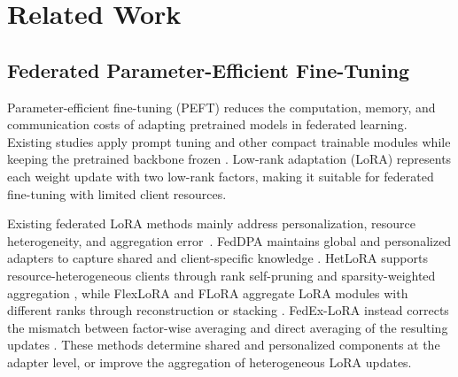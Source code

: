 \documentclass[lettersize,journal]{IEEEtran}
\begin{document}
	
	\section{Related Work}
	
	\subsection{Federated Parameter-Efficient Fine-Tuning}
	Parameter-efficient fine-tuning (PEFT) reduces the computation, memory, and communication costs of adapting pretrained models in federated learning. Existing studies apply prompt tuning and other compact trainable modules while keeping the pretrained backbone frozen \cite{che2023federated,sun2024fedbpt,guo2024promptfl}. Low-rank adaptation (LoRA) represents each weight update with two low-rank factors, making it suitable for federated fine-tuning with limited client resources.
	
	Existing federated LoRA methods mainly address personalization, resource heterogeneity, and aggregation error~\cite{yang2025fedlorasurvey,koo2025towards,byun2025towards,
		shen2025pfedgpt}. FedDPA maintains global and personalized adapters to capture shared and client-specific knowledge \cite{yang2024dual}. HetLoRA supports resource-heterogeneous clients through rank self-pruning and sparsity-weighted aggregation \cite{cho2024heterogeneous}, while FlexLoRA and FLoRA aggregate LoRA modules with different ranks through reconstruction or stacking \cite{bai2024federated,wang2024flora}. FedEx-LoRA instead corrects the mismatch between factor-wise averaging and direct averaging of the resulting updates \cite{singhal2025fedex}. These methods determine shared and personalized components at the adapter level, or improve the aggregation of heterogeneous LoRA updates. 
	
\end{document}
